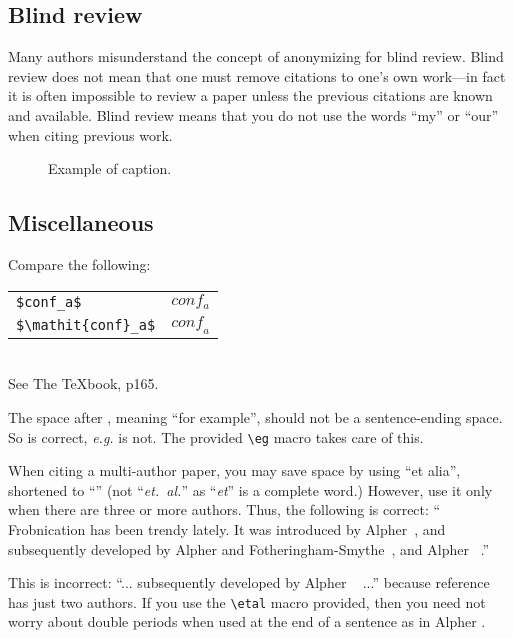 \documentclass[10pt,twocolumn,letterpaper]{article}
\begin{document}
\subsection{Blind review}
Many authors misunderstand the concept of anonymizing for blind
review.  Blind review does not mean that one must remove
citations to one's own work---in fact it is often impossible to
review a paper unless the previous citations are known and
available.
Blind review means that you do not use the words ``my'' or ``our''
when citing previous work.

\begin{figure}[t]
\begin{center}
\fbox{\rule{0pt}{2in} \rule{0.9\linewidth}{0pt}}
\end{center}
   \caption{Example of caption.  }
\label{fig:long}
\label{fig:onecol}
\end{figure}

\subsection{Miscellaneous}

\noindent
Compare the following:\\
\begin{tabular}{ll}
 \verb'$conf_a$' &  $conf_a$ \\
 \verb'$\mathit{conf}_a$' & $\mathit{conf}_a$
\end{tabular}\\
See The \TeX book, p165.

The space after \eg, meaning ``for example'', should not be a
sentence-ending space. So \eg is correct, {\em e.g.} is not.  The provided
\verb'\eg' macro takes care of this.

When citing a multi-author paper, you may save space by using ``et alia'',
shortened to ``\etal'' (not ``{\em et.\ al.}'' as ``{\em et}'' is a complete word.)
However, use it only when there are three or more authors.  Thus, the
following is correct: ``
   Frobnication has been trendy lately.
   It was introduced by Alpher~\cite{Alpher02}, and subsequently developed by
   Alpher and Fotheringham-Smythe~\cite{Alpher03}, and Alpher \etal~\cite{Alpher04}.''

This is incorrect: ``... subsequently developed by Alpher \etal~\cite{Alpher03} ...''
because reference~\cite{Alpher03} has just two authors.  If you use the
\verb'\etal' macro provided, then you need not worry about double periods
when used at the end of a sentence as in Alpher \etal.
\end{document}
